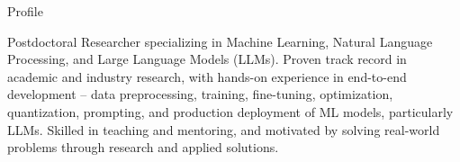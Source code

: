 


\begin{rubric}{Profile}
\begin{minipage}{\textwidth}
Postdoctoral Researcher specializing in Machine Learning, Natural Language Processing, and Large Language Models (LLMs). Proven track record in academic and industry research, with hands-on experience in end-to-end development -- data preprocessing, training, fine-tuning, optimization, quantization, prompting, and production deployment of ML models, particularly LLMs. Skilled in teaching and mentoring, and motivated by solving real-world problems through research and applied solutions.
\end{minipage}
\end{rubric}

